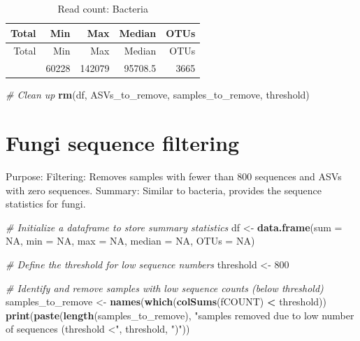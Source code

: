 \documentclass[
  11pt,
]{article}
\newenvironment{Shaded}{\begin{snugshade}}{\end{snugshade}}
\newcommand{\AttributeTok}[1]{\textcolor[rgb]{0.13,0.29,0.53}{#1}}
\newcommand{\CommentTok}[1]{\textcolor[rgb]{0.56,0.35,0.01}{\textit{#1}}}
\newcommand{\ConstantTok}[1]{\textcolor[rgb]{0.56,0.35,0.01}{#1}}
\newcommand{\DecValTok}[1]{\textcolor[rgb]{0.00,0.00,0.81}{#1}}
\newcommand{\FunctionTok}[1]{\textcolor[rgb]{0.13,0.29,0.53}{\textbf{#1}}}
\newcommand{\NormalTok}[1]{#1}
\newcommand{\OtherTok}[1]{\textcolor[rgb]{0.56,0.35,0.01}{#1}}
\newcommand{\SpecialCharTok}[1]{\textcolor[rgb]{0.81,0.36,0.00}{\textbf{#1}}}
\newcommand{\StringTok}[1]{\textcolor[rgb]{0.31,0.60,0.02}{#1}}
\begin{document}
\begin{longtable}[]{@{}rrrrr@{}}
\caption{Read count: Bacteria}\tabularnewline
\toprule\noalign{}
Total & Min & Max & Median & OTUs \\
\midrule\noalign{}
\endfirsthead
\toprule\noalign{}
Total & Min & Max & Median & OTUs \\
\midrule\noalign{}
\endhead
\bottomrule\noalign{}
\endlastfoot
5633798 & 60228 & 142079 & 95708.5 & 3665 \\
\end{longtable}

\begin{Shaded}
\begin{Highlighting}[]
\CommentTok{\# Clean up}
\FunctionTok{rm}\NormalTok{(df, ASVs\_to\_remove, samples\_to\_remove, threshold)}
\end{Highlighting}
\end{Shaded}

\section{Fungi sequence filtering}\label{fungi-sequence-filtering}

Purpose: Filtering: Removes samples with fewer than 800 sequences and
ASVs with zero sequences. Summary: Similar to bacteria, provides the
sequence statistics for fungi.

\begin{Shaded}
\begin{Highlighting}[]
\CommentTok{\# Initialize a dataframe to store summary statistics}
\NormalTok{df }\OtherTok{\textless{}{-}} \FunctionTok{data.frame}\NormalTok{(}\AttributeTok{sum =} \ConstantTok{NA}\NormalTok{, }\AttributeTok{min =} \ConstantTok{NA}\NormalTok{, }\AttributeTok{max =} \ConstantTok{NA}\NormalTok{, }\AttributeTok{median =} \ConstantTok{NA}\NormalTok{, }\AttributeTok{OTUs =} \ConstantTok{NA}\NormalTok{)}

\CommentTok{\# Define the threshold for low sequence numbers}
\NormalTok{threshold }\OtherTok{\textless{}{-}} \DecValTok{800}

\CommentTok{\# Identify and remove samples with low sequence counts (below threshold)}
\NormalTok{samples\_to\_remove }\OtherTok{\textless{}{-}} \FunctionTok{names}\NormalTok{(}\FunctionTok{which}\NormalTok{(}\FunctionTok{colSums}\NormalTok{(fCOUNT) }\SpecialCharTok{\textless{}}\NormalTok{ threshold))}
\FunctionTok{print}\NormalTok{(}\FunctionTok{paste}\NormalTok{(}\FunctionTok{length}\NormalTok{(samples\_to\_remove), }\StringTok{"samples removed due to low number of sequences (threshold \textless{}"}\NormalTok{, threshold, }\StringTok{")"}\NormalTok{))}
\end{Highlighting}
\end{Shaded}
\end{document}
